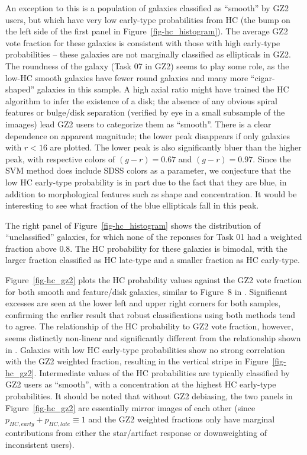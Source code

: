 \documentclass[useAMS,usenatbib]{mn2e}
\begin{document}
An exception to this is a population of galaxies classified as ``smooth'' by GZ2 users, but which have very low early-type probabilities from HC (the bump on the left side of the first panel in Figure~\ref{fig-hc_histogram}). The average GZ2 vote fraction for these galaxies is consistent with those with high early-type probabilities -- these galaxies are not marginally classified as ellipticals in GZ2. The roundness of the galaxy (Task 07 in GZ2) seems to play some role, as the low-HC smooth galaxies have fewer round galaxies and many more ``cigar-shaped'' galaxies in this sample. A high axial ratio might have trained the HC algorithm to infer the existence of a disk; the absence of any obvious spiral features or bulge/disk separation (verified by eye in a small subsample of the imaages) lead GZ2 users to categorize them as ``smooth''. There is a clear dependence on apparent magnitude; the lower peak disappears if only galaxies with $r < 16$ are plotted. The lower peak is also significantly bluer than the higher peak, with respective colors of $(g-r)=0.67$ and $(g-r)=0.97$. Since the SVM method does include SDSS colors as a parameter, we conjecture that the low HC early-type probability is in part due to the fact that they are blue, in addition to morphological features such as shape and concentration. It would be interesting to see what fraction of the blue ellipticals \citep{sch09} fall in this peak. 

The right panel of Figure~\ref{fig-hc_histogram} shows the distribution of ``unclassified'' galaxies, for which none of the reponses for Task 01 had a weighted fraction above 0.8. The HC probability for these galaxies is bimodal, with the larger fraction classified as HC late-type and a smaller fraction as HC early-type. 

Figure~\ref{fig-hc_gz2} plots the HC probability values against the GZ2 vote fraction for both smooth and feature/disk galaxies, similar to Figure~8 in \citet{hue11}. Significant excesses are seen at the lower left and upper right corners for both samples, confirming the earlier result that robust classifications using both methods tend to agree. The relationship of the HC probability to GZ2 vote fraction, however, seems distinctly non-linear and significantly different from the relationship shown in \citet{hue11}. Galaxies with low HC early-type probabilities show no strong correlation with the GZ2 weighted fraction, resulting in the vertical stripe in Figure~\ref{fig-hc_gz2}. Intermediate values of the HC probabilities are typically classified by GZ2 users as ``smooth'', with a concentration at the highest HC early-type probabilities. It should be noted that without GZ2 debiasing, the two panels in Figure~\ref{fig-hc_gz2} are essentially mirror images of each other (since $p_{HC,early} + p_{HC,late} \equiv 1$ and the GZ2 weighted fractions only have marginal contributions from either the star/artifact response or downweighting of inconsistent users). 
\end{document}
